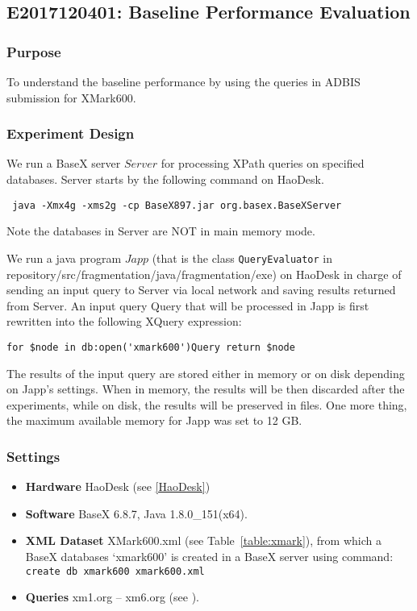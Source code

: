 \subsection{E2017120401: Baseline Performance Evaluation}
 
\subsubsection{Purpose}
To understand the baseline performance by using
the queries in ADBIS submission for XMark600. 

\subsubsection{Experiment Design}  

We run a BaseX server $Server$ for processing XPath queries on specified 
databases. Server starts by the following command on HaoDesk.

\verb| java -Xmx4g -xms2g -cp BaseX897.jar org.basex.BaseXServer|

Note the databases in Server are NOT in main memory mode.

We run a java program $Japp$ (that is the class \texttt{QueryEvaluator} 
in repository/src/fragmentation/java/fragmentation/exe)
on HaoDesk in charge of sending an input query to
Server via local network and saving results returned from Server. An input query 
Query that will be processed in Japp is first rewritten into the following XQuery expression:

\verb|for $node in db:open('xmark600')Query return $node|

The results of the input query are stored either in memory or on disk depending on Japp's settings. When in memory, the results will be then discarded after the
experiments, while on disk, the results will be preserved in files. One more thing, the maximum available memory for Japp was set to 12 GB.

\subsubsection{Settings} 

\begin{itemize}
	
	\item \textbf{Hardware} HaoDesk (see \ref{HaoDesk})\\
	\item \textbf{Software} BaseX 6.8.7, Java 1.8.0\_151(x64).\\
	\item \textbf{XML Dataset} XMark600.xml (see Table~\ref{table:xmark}), 
	from which a BaseX databases `xmark600' is created in a BaseX server using command:\\
	\verb|create db xmark600 xmark600.xml|
	\item \textbf{Queries} xm1.org -- xm6.org (see ).
	
\end{itemize}


